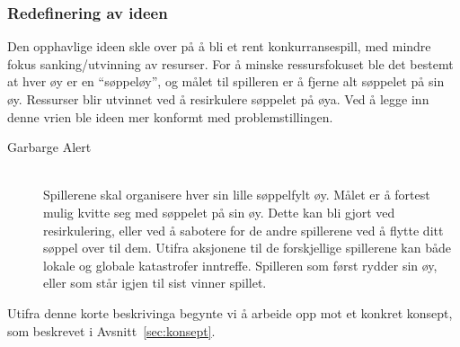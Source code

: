 \subsubsection{Redefinering av ideen}
Den opphavlige ideen skle over på å bli et rent konkurransespill, med
mindre fokus sanking/utvinning av resurser. For å minske ressursfokuset
ble det bestemt at hver øy er en ``søppeløy'', og målet til spilleren er
å fjerne alt søppelet på sin øy.  Ressurser blir utvinnet ved å
resirkulere søppelet på øya. Ved å legge inn denne vrien ble ideen mer
konformt med problemstillingen. 
\begin{description}
\item[Garbarge Alert] \hfill\\
Spillerene skal organisere hver sin lille søppelfylt øy. Målet er å
fortest mulig kvitte seg med søppelet på sin øy. Dette kan bli gjort ved
resirkulering, eller ved å sabotere for de andre spillerene ved å flytte
ditt søppel over til dem. Utifra aksjonene til de forskjellige
spillerene kan både lokale og globale katastrofer inntreffe. Spilleren
som først rydder sin øy, eller som står igjen til sist vinner spillet.
\end{description}
Utifra denne korte beskrivinga begynte vi å arbeide opp mot et konkret
konsept, som beskrevet i Avsnitt~\ref{sec:konsept}.
